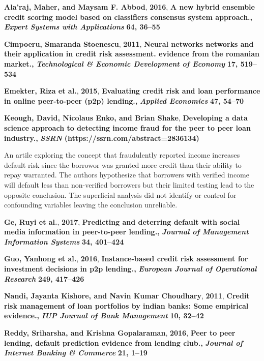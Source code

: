 \documentclass[conference,final,]{IEEEtran}
\begin{document}
\textbf{Ala'raj, Maher, and Maysam F. Abbod}, \textbf{2016}, \textbf{A
new hybrid ensemble credit scoring model based on classifiers consensus
system approach., }\textbf{\emph{Expert Systems with
Applications}}\textbf{ 64}\textbf{, 36--55}

\textbf{Cimpoeru, Smaranda Stoenescu}, \textbf{2011}, \textbf{Neural
networks networks and their application in credit risk assessment.
evidence from the romanian market., }\textbf{\emph{Technological \&
Economic Development of Economy}}\textbf{ 17}\textbf{, 519--534}

\textbf{Emekter, Riza et al.}, \textbf{2015}, \textbf{Evaluating credit
risk and loan performance in online peer-to-peer (p2p) lending.,
}\textbf{\emph{Applied Economics}}\textbf{ 47}\textbf{, 54--70}

\textbf{Keough, David, Nicolaus Enko, and Brian Shake},
\textbf{Developing a data science approach to detecting income fraud for
the peer to peer loan industry., }\textbf{\emph{SSRN}}\textbf{
(https://ssrn.com/abstract=2836134)}

An artile exploring the concept that fraudulently reported income
increases default risk since the borrowor was granted more credit than
their ability to repay warranted. The authors hypothesize that borrowers
with verified income will default less than non-verified borrowers but
their limited testing lead to the opposite conclusion. The superficial
analysis did not identify or control for confounding variables leaving
the conclusion unreliable.

\textbf{Ge, Ruyi et al.}, \textbf{2017}, \textbf{Predicting and
deterring default with social media information in peer-to-peer
lending., }\textbf{\emph{Journal of Management Information
Systems}}\textbf{ 34}\textbf{, 401--424}

\textbf{Guo, Yanhong et al.}, \textbf{2016}, \textbf{Instance-based
credit risk assessment for investment decisions in p2p lending.,
}\textbf{\emph{European Journal of Operational Research}}\textbf{
249}\textbf{, 417--426}

\textbf{Nandi, Jayanta Kishore, and Navin Kumar Choudhary},
\textbf{2011}, \textbf{Credit risk management of loan portfolios by
indian banks: Some empirical evidence., }\textbf{\emph{IUP Journal of
Bank Management}}\textbf{ 10}\textbf{, 32--42}

\textbf{Reddy, Sriharsha, and Krishna Gopalaraman}, \textbf{2016},
\textbf{Peer to peer lending, default prediction evidence from lending
club., }\textbf{\emph{Journal of Internet Banking \& Commerce}}\textbf{
21}\textbf{, 1--19}
\end{document}

